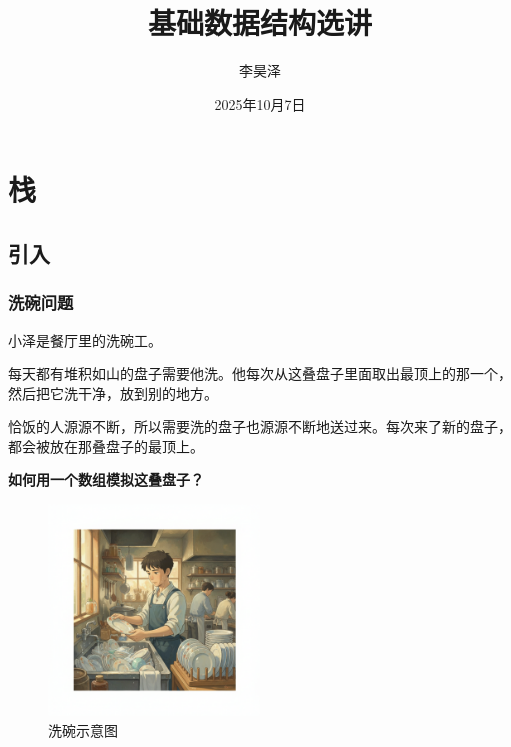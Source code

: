 \documentclass{report}
\title{\huge 基础数据结构选讲}
\author{李昊泽}
\date{2025年10月7日}
\begin{document}
\maketitle

\newpage

\tableofcontents

\newpage

\chapter{栈}

\section{引入}

\subsection{洗碗问题}

小泽是餐厅里的洗碗工。

每天都有堆积如山的盘子需要他洗。他每次从这叠盘子里面取出最顶上的那一个，然后把它洗干净，放到别的地方。

恰饭的人源源不断，所以需要洗的盘子也源源不断地送过来。每次来了新的盘子，都会被放在那叠盘子的最顶上。

\textbf{如何用一个数组模拟这叠盘子？}

\begin{figure}[ht]
    \centering
    \includegraphics[width=0.5\textwidth]{./pic/Gemini_Generated_Image_4uekal4uekal4uek.png}
    \caption{洗碗示意图}
\end{figure}
\end{document}
